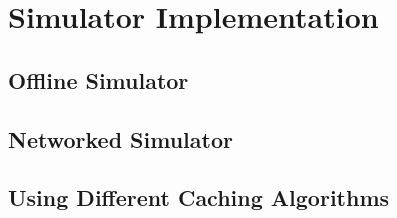 \section{Simulator Implementation}
\subsection{Offline Simulator}
\subsection{Networked Simulator}
\subsection{Using Different Caching Algorithms}

